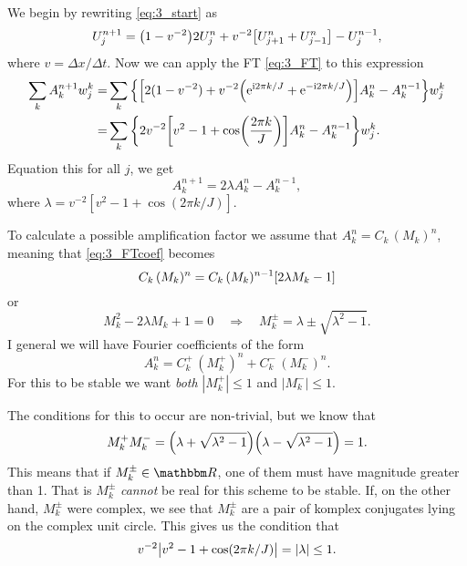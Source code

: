 \documentclass[11pt,letter, swedish, english
]{article}
\newcommand{\Dx}{\ensuremath{\Delta{x}}}
\newcommand{\Dt}{\ensuremath{\Delta{t}}}
\begin{document}
We begin by rewriting \eqref{eq:3_start} as
\begin{equation}
U_j^{n+1}=\qty(1-v^{-2})2U_j^n+v^{-2}\qty[U_{j+1}^n+U_{j-1}^n]
-U_j^{n-1},
\end{equation}
where $v=\Dx/\Dt$. Now we can apply the FT \eqref{eq:3_FT} to this
expression
\begin{equation}
\begin{aligned}
\sum_kA_k^{n+1}w_j^k=&\sum_k \qty{\qty[
2(1-v^{-2})+v^{-2}\qty(\mathrm{e}^{\mathrm{i}2\pi k/J}+\mathrm{e}^{-\mathrm{i}2\pi k/J})]A_k^n
-A_k^{n-1} }w_j^k\\
=&\sum_k \qty{2v^{-2}\qty[
v^{2}-1+\cos(\frac{2\pi k}{J})]A_k^n
-A_k^{n-1} }w_j^k.
\end{aligned}
\end{equation}
Equation this for all $j$, we get
\begin{equation}\label{eq:3_FTcoef}
A_k^{n+1}=2\lambda A_k^n-A_k^{n-1},
\end{equation}
where $\lambda=v^{-2}[v^{2}-1+\cos(2\pi k/J)]$.

To calculate a possible amplification factor we assume that
$A_k^n=C_k\,(M_k)^n$, meaning that \eqref{eq:3_FTcoef} becomes
\begin{equation}
C_k\,(M_k)^n=C_k\,(M_k)^{n-1}\qty[2\lambda M_k-1]
\end{equation}
or
\begin{equation}
M_k^2-2\lambda M_k+1=0
\quad\Longrightarrow\quad
M_k^\pm=\lambda\pm\sqrt{\lambda^2-1}.
\end{equation}
I  general we will have Fourier coefficients of the form
\begin{equation}
A_k^n=C_k^+\,(M_k^+)^n+C_k^-\,(M_k^-)^n.
\end{equation}
For this to be stable we want \emph{both} $|M_k^+|\le1$ and
$|M_k^-|\le1$. 

The conditions for this to occur are non-trivial, but we know that 
\begin{equation}
M_k^+M_k^-=\qty(\lambda+\sqrt{\lambda^2-1})
\qty(\lambda-\sqrt{\lambda^2-1})
=1.
\end{equation}
This means that if $M_k^\pm\in\R$, one of them must have magnitude
greater than 1. That is $M_k^\pm$ \emph{cannot} be real for this
scheme to be stable. If, on the other hand, $M_k^\pm$ were complex, we
see that $M_k^\pm$ are a pair of komplex conjugates lying on the
complex unit circle. This gives us the condition that
\begin{equation}\label{eq:3_lambdacond}
v^{-2}\abs{v^{2}-1+\cos(2\pi k/J)}=|\lambda|\le1.
\end{equation}
\end{document}
